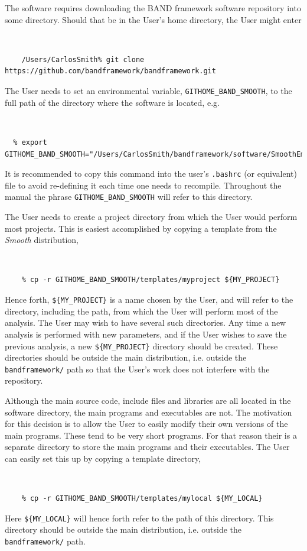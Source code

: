 \documentclass[UserManual.tex]{subfiles}
\begin{document}
The software requires downloading the BAND framework software repository into some directory. Should that be in the User's home directory, the User might enter
{\tt 
\begin{verbatim}
    /Users/CarlosSmith% git clone https://github.com/bandframework/bandframework.git
\end{verbatim}
}
The User needs to set an environmental variable, {\tt GITHOME\_BAND\_SMOOTH}, to the full path of the directory where the software is located, e.g. 
{\tt
\begin{verbatim}
  % export GITHOME_BAND_SMOOTH="/Users/CarlosSmith/bandframework/software/SmoothEmulator"
\end{verbatim}
}
It is recommended to copy this command into the user's {\tt .bashrc} (or equivalent) file to avoid re-defining it each time one needs to recompile. Throughout the manual the phrase {\tt GITHOME\_BAND\_SMOOTH} will refer to this directory. 

The User needs to create a project directory from which the User would perform most projects. This is easiest accomplished by copying a template from the {\it Smooth} distribution,
{\tt
\begin{verbatim}
    % cp -r GITHOME_BAND_SMOOTH/templates/myproject ${MY_PROJECT}
\end{verbatim}
}
Hence forth, {\tt \$\{MY\_PROJECT\}} is a name chosen by the User, and will refer to the directory, including the path, from which the User will perform most of the analysis. The User may wish to have several such directories. Any time a new analysis is performed with new parameters, and if the User wishes to save the previous analysis, a new {\tt \$\{MY\_PROJECT\}} directory should be created. These directories should be outside the main distribution, i.e. outside the {\tt bandframework/} path so that the User's work does not interfere with the repository. 

Although the main source code, include files and libraries are all located in the software directory, the main programs and executables are not. The motivation for this decision is to allow the User to easily modify their own versions of the main programs. These tend to be very short programs. For that reason their is a separate directory to store the main programs and their executables. The User can easily set this up by copying a template directory,
{\tt 
\begin{verbatim}
    % cp -r GITHOME_BAND_SMOOTH/templates/mylocal ${MY_LOCAL}
\end{verbatim}
}
Here {\tt \$\{MY\_LOCAL\}} will hence forth refer to the path of this directory. This directory should be outside the main distribution, i.e. outside the {\tt bandframework/} path. 
\end{document}

